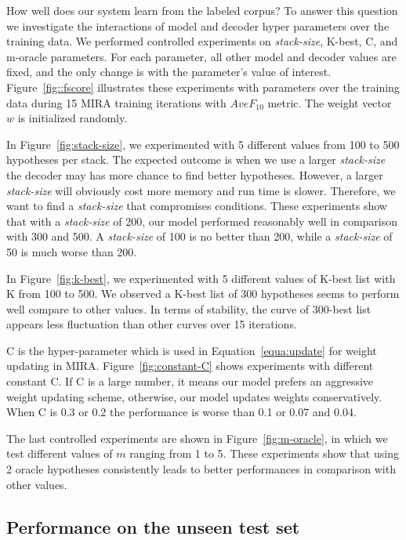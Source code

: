 \documentclass[10pt]{article}
\begin{document}
How well does our system learn from the labeled corpus?
To answer this question we investigate the interactions of model and decoder hyper parameters over the training data.
We performed controlled experiments on \textit{stack-size}, K-best, C, and m-oracle parameters.
For each parameter, all other model and decoder values are fixed, and the only change is with the parameter's value of interest.
Figure~\ref{fig::fscore} illustrates these experiments with parameters over the training data during 15 MIRA training iterations with $AveF_{10}$ metric.
The weight vector $w$ is initialized randomly.

In Figure~\ref{fig:stack-size}, we experimented with 5 different values from 100 to 500 hypotheses per stack. 
The expected outcome is when we use a larger \textit{stack-size} the decoder may has more chance to find better hypotheses.
However, a larger \textit{stack-size} will obviously cost more memory and run time is slower.
Therefore, we want to find a \textit{stack-size} that compromises conditions.
These experiments show that with a \textit{stack-size} of 200, our model performed reasonably well in comparison with 300 and 500.
A \textit{stack-size} of 100 is no better than 200, while a \textit{stack-size} of 50 is much worse than 200.

In Figure~\ref{fig:k-best}, we experimented with 5 different values of K-best list with K from 100 to 500.
We observed a K-best list of 300 hypotheses seems to perform well compare to other values.
In terms of stability, the curve of 300-best list appears less fluctuation than other curves over 15 iterations.

C is the hyper-parameter which is used in Equation~\ref{equa:update} for weight updating in MIRA.
Figure~\ref{fig:constant-C} shows experiments with different constant C.
If C is a large number, it means our model prefers an aggressive weight updating scheme, otherwise, our model updates weights conservatively.
When C is 0.3 or 0.2 the performance is worse than 0.1 or 0.07 and 0.04.

The last controlled experiments are shown in Figure~\ref{fig:m-oracle}, in which we test different values of $m$ ranging from 1 to 5.
These experiments show that using 2 oracle hypotheses consistently leads to better performances in comparison with other values.

\subsection{Performance on the unseen test set}
\end{document}

